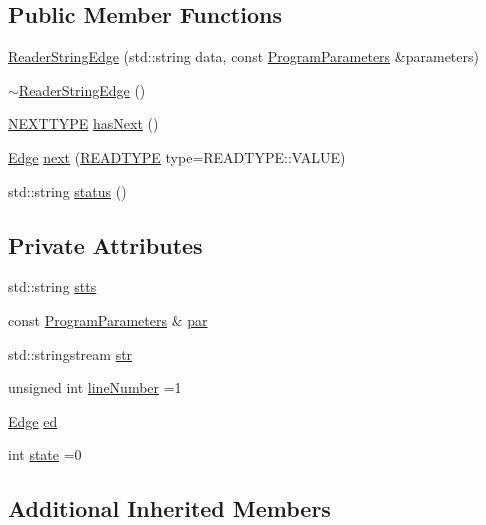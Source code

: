 \subsection*{Public Member Functions}
\begin{DoxyCompactItemize}
\item 
\hyperlink{classReaderStringEdge_acfd14224a4533371c4c2314d1434e65c}{Reader\+String\+Edge} (std\+::string data, const \hyperlink{structProgramParameters}{Program\+Parameters} \&parameters)
\item 
\hyperlink{classReaderStringEdge_a076dd2db15a1260c0bdf4d33e2144989}{$\sim$\+Reader\+String\+Edge} ()
\item 
\hyperlink{classReaderInterface_ac2420ec8d2f60feadf2533d4fa77ec5e}{N\+E\+X\+T\+T\+Y\+PE} \hyperlink{classReaderStringEdge_a7c43108413f8f867d5ee2cb35d777cd3}{has\+Next} ()
\item 
\hyperlink{classEdge}{Edge} \hyperlink{classReaderStringEdge_a8de930135fa1fbb3a9610da2259e93ce}{next} (\hyperlink{classReaderInterface_a1e3610c289ae058a246de41154d8a266}{R\+E\+A\+D\+T\+Y\+PE} type=R\+E\+A\+D\+T\+Y\+P\+E\+::\+V\+A\+L\+UE)
\item 
std\+::string \hyperlink{classReaderStringEdge_a11fe073e85d07a48d0f0549b51af36b6}{status} ()
\end{DoxyCompactItemize}
\subsection*{Private Attributes}
\begin{DoxyCompactItemize}
\item 
std\+::string \hyperlink{classReaderStringEdge_a574864595ff76d5a314381de5abc1d4d}{stts}
\item 
const \hyperlink{structProgramParameters}{Program\+Parameters} \& \hyperlink{classReaderStringEdge_a25c492c42f28ea51ae221296af64e22f}{par}
\item 
std\+::stringstream \hyperlink{classReaderStringEdge_a65e74b837b4d980c02896e2ca6075e80}{str}
\item 
unsigned int \hyperlink{classReaderStringEdge_aedd4a248823de485292a9d567cc85823}{line\+Number} =1
\item 
\hyperlink{classEdge}{Edge} \hyperlink{classReaderStringEdge_ac0b972f8b6c07ec0e70cc6c9a8531216}{ed}
\item 
int \hyperlink{classReaderStringEdge_a161ca1067fea9a10cea938c9f134ecce}{state} =0
\end{DoxyCompactItemize}
\subsection*{Additional Inherited Members}


